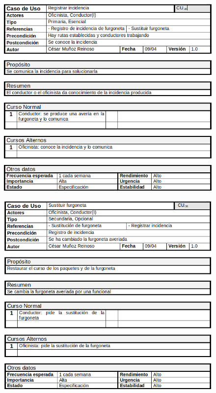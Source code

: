 \begin{figure}[H]
	\centering
	\includegraphics[width=16cm]{13}
\end{figure}
\begin{figure}[H]
	\centering
	\includegraphics[width=16cm]{14}
\end{figure}
